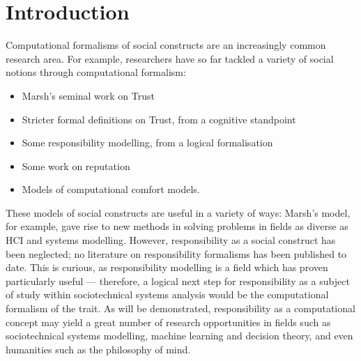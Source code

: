 \section{Introduction}\label{sec:intro}

Computational formalisms of social constructs are an increasingly common research area. For example, researchers have so far tackled a variety of social notions through computational formalism:

\begin{itemize}
    \item Marsh's seminal work on Trust\cite{Marsh1994FormalisingConcept}
    
    \item Stricter formal definitions on Trust, from a cognitive standpoint\cite{CastelfranchiSocialApproach}
    
    \item Some responsibility modelling, from a logical formalisation\cite{Simpson2015FormalisingAnalysis}
    
    \item Some work on reputation~\cite{Chandrasekaran2011ASystems}

    \item Models of computational comfort models\cite{Marsh2011}.
    
\end{itemize}

These models of social constructs are useful in a variety of ways: Marsh's model, for example, gave rise to new methods in solving problems in fields as diverse as HCI\cite{designing_with_trust} and systems modelling\cite{Huynh2006}. However, responsibility as a social construct has been neglected; no literature on responsibility formalisms has been published to date. This is curious, as responsibility modelling is a field which has proven particularly useful --- therefore, a logical next step for responsibility as a subject of study within sociotechnical systems analysis would be the computational formalism of the trait. As will be demonstrated, responsibility as a computational concept may yield a great number of research opportunities in fields such as sociotechnical systems modelling, machine learning and decision theory, and even humanities such as the philosophy of mind.

